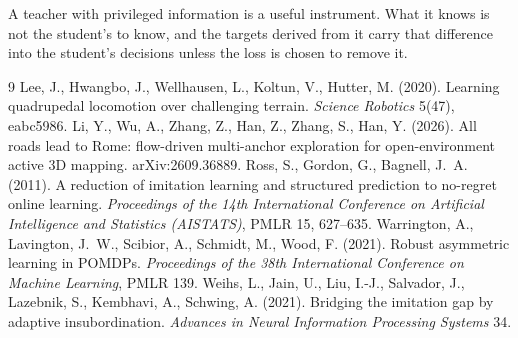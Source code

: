 \documentclass[11pt]{article}
\theoremstyle{definition}
\begin{document}
A teacher with privileged information is a useful instrument. What it knows is not the student's to know, and the targets derived from it carry that difference into the student's decisions unless the loss is chosen to remove it.

\begin{thebibliography}{9}
 Lee, J., Hwangbo, J., Wellhausen, L., Koltun, V., Hutter, M. (2020). Learning quadrupedal locomotion over challenging terrain. \emph{Science Robotics} 5(47), eabc5986.
 Li, Y., Wu, A., Zhang, Z., Han, Z., Zhang, S., Han, Y. (2026). All roads lead to Rome: flow-driven multi-anchor exploration for open-environment active 3D mapping. arXiv:2609.36889.
 Ross, S., Gordon, G., Bagnell, J.~A. (2011). A reduction of imitation learning and structured prediction to no-regret online learning. \emph{Proceedings of the 14th International Conference on Artificial Intelligence and Statistics (AISTATS)}, PMLR 15, 627--635.
 Warrington, A., Lavington, J.~W., Scibior, A., Schmidt, M., Wood, F. (2021). Robust asymmetric learning in POMDPs. \emph{Proceedings of the 38th International Conference on Machine Learning}, PMLR 139.
 Weihs, L., Jain, U., Liu, I.-J., Salvador, J., Lazebnik, S., Kembhavi, A., Schwing, A. (2021). Bridging the imitation gap by adaptive insubordination. \emph{Advances in Neural Information Processing Systems} 34.
\end{thebibliography}
\end{document}
